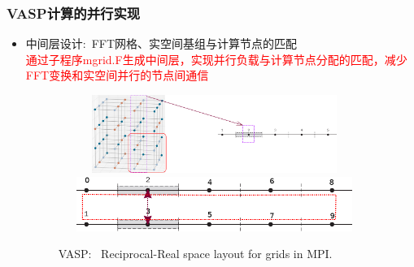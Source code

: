 \frame
{
	\frametitle{\textrm{VASP}计算的并行实现}
	\begin{itemize}
	     \item 中间层设计:~\textrm{FFT}网格、实空间基组与计算节点的匹配\\
		     \textcolor{red}{通过子程序\textrm{mgrid.F}生成中间层，实现并行负载与计算节点分配的匹配，减少\textrm{FFT}变换和实空间并行的节点间通信}
\begin{figure}[h!]
		\vspace{-0.25in}
	\centering
\includegraphics[height=1.0in,width=4.0in,viewport=0 0 1500 450,clip]{Figures/VASP_FFT-MPI_Reciprocal.png}
\vskip 0.5pt
\includegraphics[height=0.7in,width=4.0in,viewport=0 0 730 150,clip]{Figures/VASP_FFT-MPI_Real.png}
\caption{\tiny \textrm{VASP:~ Reciprocal-Real space layout for grids in MPI.}}%
\label{MPI-FFT}
\end{figure} 
	\end{itemize}
}

